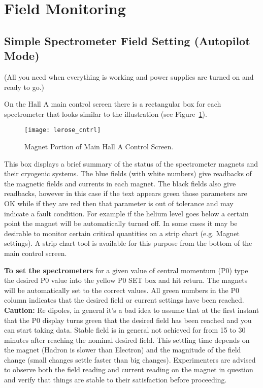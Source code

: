 \section{Field Monitoring}
\subsection{Simple Spectrometer Field Setting (Autopilot Mode)}
\noindent (All you need when everything is working and power
 supplies are turned on and ready to go.)

 \noindent 
 On the Hall A main control screen there is a rectangular box for each spectrometer that looks similar to the illustration
(see Figure~\ref{fig:cntrl}). 

\begin{figure}
\begin{center}
\texttt{[image: lerose\_cntrl]}
{\linespread{1.}
\caption[Spectrometers: Magnet Controls Screen]{Magnet Portion of Main Hall A Control Screen.}
\label{fig:cntrl}}
\end{center}
\end{figure}

This box displays a brief summary of the status of the spectrometer magnets and their cryogenic systems. The blue fields 
(with white numbers) give readbacks of the magnetic fields and currents in each magnet. The black fields also give readbacks, 
however in this case if the text appears green those parameters are OK while if they are red then that parameter is out of 
tolerance and may indicate a fault condition. For example if the helium level goes below a certain point the magnet will be 
automatically turned off.  In some cases it may be desirable to monitor certain critical quantities on a strip chart 
(e.g. Magnet settings). A strip chart tool is available for this purpose from the bottom of the main control screen.

{\bf To set the spectrometers} for a given value of central momentum (P0) type the desired P0 value into the yellow P0 SET box and hit return. The magnets will be automatically set to the correct values. All green numbers in the P0 column indicates that the desired field or current settings have been reached. 
{\bf Caution:} Re dipoles, in general it's a bad idea to assume that at the first instant that the P0 display turns green that the desired field has been reached and you can start taking data. Stable field is in general not achieved for from 15 to 30 minutes after reaching the nominal desired field. This settling time depends on the magnet (Hadron is slower than Electron) and the magnitude of the field change (small changes settle faster than big changes). Experimenters are advised to observe both the field reading and current reading on the magnet in question and verify that things are stable to their satisfaction before proceeding.
 
